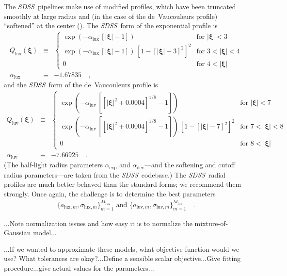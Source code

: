\documentclass[12pt,pdftex,preprint]{aastex}
\newcommand{\project}[1]{\textsl{#1}}
\newcommand{\sdss}{\project{SDSS}}
\newcommand{\tvector}[1]{\boldsymbol{#1}}
\newcommand{\spos}{\tvector{\xi}}
\newcommand{\dev}{\mathrm{dev}}
\newcommand{\lux}{\mathrm{lux}}
\newcommand{\luv}{\mathrm{luv}}
\begin{document}
The \sdss\ pipelines make use of modified profiles, which have been
truncated smoothly at large radius and (in the case of the
de~Vaucouleurs profile) ``softened'' at the center (\citealt{lupton}).
The \sdss\ form of the exponential profile is
\begin{eqnarray}\displaystyle
Q_{\lux}(\spos) &\equiv& \left\{\begin{array}{ll}
  \exp(-\alpha_{\lux}\,[|\spos| - 1]) & \mbox{for~}|\spos| < 3 \\
  \exp(-\alpha_{\lux}\,[|\spos| - 1])
  \,\left[1 - [|\spos| - 3]^2\right]^2 & \mbox{for~}3 < |\spos| < 4 \\
  0                                   & \mbox{for~}4 < |\spos|
\end{array}\right.
\\
\alpha_{\lux} &\equiv& -1.67835
\quad ,
\end{eqnarray}
and the \sdss\ form of the de~Vaucouleurs profile is
\begin{eqnarray}\displaystyle
Q_{\luv}(\spos) &\equiv& \left\{\begin{array}{ll}
  \exp(-\alpha_{\luv}\,\left[[|\spos|^2 + 0.0004]^{1/8} - 1\right]) & \mbox{for~}|\spos| < 7 \\
  \exp(-\alpha_{\luv}\,\left[[|\spos|^2 + 0.0004]^{1/8} - 1\right])
  \,\left[1 - [|\spos| - 7]^2\right]^2 & \mbox{for~}7 < |\spos| < 8 \\
  0                                   & \mbox{for~}8 < |\spos|
\end{array}\right.
\\
\alpha_{\luv} &\equiv& -7.66925
\quad .
\end{eqnarray}
(The half-light radius parameters $\alpha_{\exp}$ and
$\alpha_{\dev}$---and the softening and cutoff radius parameters---are
taken from the \sdss\ codebase.)  The \sdss\ radial profiles are much
better behaved than the standard forms; we recommend them strongly.
Once again, the challenge is to determine the best parameters
\begin{eqnarray}
\{a_{\lux,m},\sigma_{\lux,m}\}_{m=1}^{M_{\lux}} \mbox{~and~} \{a_{\luv,m},\sigma_{\luv,m}\}_{m=1}^{M_{\luv}}
\quad .
\end{eqnarray}

...Note normalization issues and how easy it is to normalize the mixture-of-Gaussian model...

...If we wanted to approximate these models, what objective function
would we use?  What tolerances are okay?...Define a sensible scalar
objective...Give fitting procedure...give actual values for the
parameters...
\end{document}
